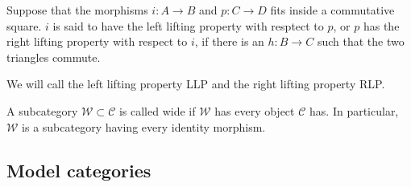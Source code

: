 \documentclass[../thesis.tex]{subfiles}
\begin{document}
        \begin{definition}
            Suppose that the morphisms $i: A \rightarrow B$ and $p: C \rightarrow D$ fits inside a commutative square. $i$ is said to have the left lifting property with resptect to $p$, or $p$ has the right lifting property with respect to $i$, if there is an $h : B \rightarrow C$ such that the two triangles commute.
            \begin{center}
            \end{center}
        \end{definition}

        \begin{remark}
            We will call the left lifting property LLP and the right lifting property RLP.
        \end{remark}

        \begin{definition}
            A subcategory $\mathcal{W} \subset \mathcal{C}$ is called wide if $\mathcal{W}$ has every object $\mathcal{C}$ has. In particular, $\mathcal{W}$ is a subcategory having every identity morphism.
        \end{definition}

        \subsection{Model categories}
\end{document}
